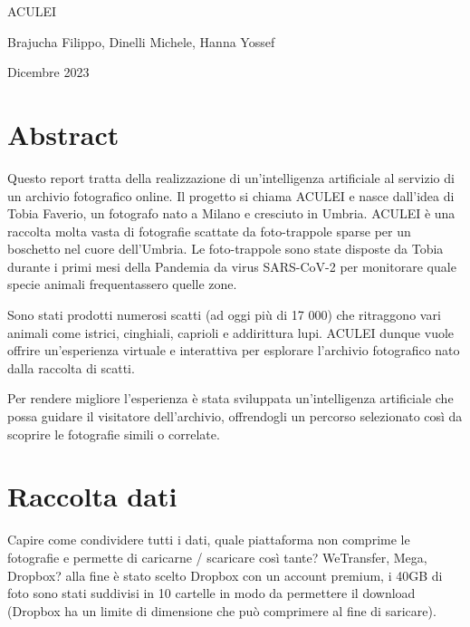 \documentclass[12pt,a4paper,twoside]{article}
\begin{document}
\begin{titlepage}
    \centering
    \vspace*{\fill}

    \vspace*{0.5cm}
    
    \huge ACULEI
    
    \vspace*{1cm}
    \small Brajucha Filippo, Dinelli Michele, Hanna Yossef
    
    \vspace*{0.5cm}
    \small Dicembre 2023
    
    \vspace*{\fill}
\end{titlepage}


\newpage

\section*{Abstract}

Questo report tratta della realizzazione di un'intelligenza artificiale al servizio di un archivio fotografico online. Il progetto si chiama ACULEI e nasce dall'idea di Tobia Faverio, un fotografo nato a Milano e cresciuto in Umbria. ACULEI è una raccolta molta vasta di fotografie scattate da foto-trappole sparse per un boschetto nel cuore dell'Umbria. Le foto-trappole sono state disposte da Tobia durante i primi mesi della Pandemia da virus SARS-CoV-2 per monitorare quale specie animali frequentassero quelle zone. 

Sono stati prodotti numerosi scatti (ad oggi più di 17 000) che ritraggono vari animali come istrici, cinghiali, caprioli e addirittura lupi. ACULEI dunque vuole offrire un'esperienza virtuale e interattiva per esplorare l'archivio fotografico nato dalla raccolta di scatti. 

Per rendere migliore l'esperienza è stata sviluppata un'intelligenza artificiale che possa guidare il visitatore dell'archivio, offrendogli un percorso selezionato così da scoprire le fotografie simili o correlate.
 
\newpage

\tableofcontents

\newpage

\section{Raccolta dati}
Capire come condividere tutti i dati, quale piattaforma non comprime le fotografie e permette di caricarne /
scaricare così tante? WeTransfer, Mega, Dropbox? alla fine è stato scelto Dropbox con un account premium, i 
40GB di foto sono stati suddivisi in 10 cartelle in modo da permettere il download (Dropbox ha un limite di 
dimensione che può comprimere al fine di saricare).
\end{document}
